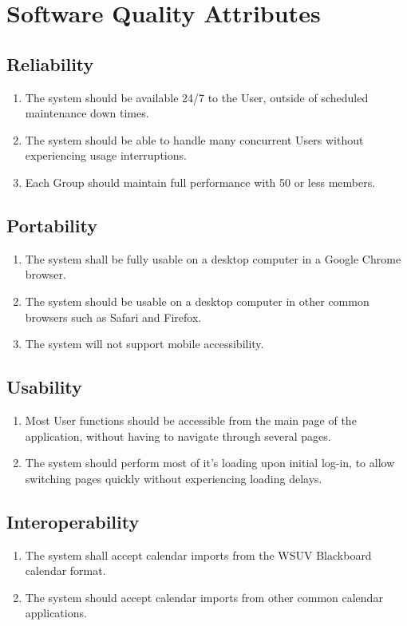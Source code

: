 \documentclass{scrreprt}
\begin{document}
\section{Software Quality Attributes}

\subsection{Reliability}
\begin{enumerate}
\item The system should be available 24/7 to the User, outside of scheduled maintenance
down times.
\item The system should be able to handle many concurrent Users without experiencing
usage interruptions.
\item Each Group should maintain full performance with 50 or less members.
\end{enumerate}

\subsection{Portability}
\begin{enumerate}
\item The system shall be fully usable on a desktop computer in a Google Chrome
browser.
\item The system should be usable on a desktop computer in other common browsers
such as Safari and Firefox.
\item The system will not support mobile accessibility.
\end{enumerate}

\subsection{Usability}
\begin{enumerate}
\item Most User functions should be accessible from the main page of the application,
without having to navigate through several pages.
\item The system should perform most of it's loading upon initial log-in, to allow
switching pages quickly without experiencing loading delays.
\end{enumerate}

\subsection{Interoperability}
\begin{enumerate}
\item The system shall accept calendar imports from the WSUV Blackboard calendar
format.
\item The system should accept calendar imports from other common calendar
applications.
\end{enumerate}
\end{document}
